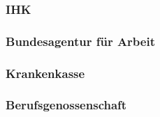 \subsubsection{IHK} \label{ihk}

\subsubsection{Bundesagentur für Arbeit} \label{bundesagenturFuerArbeit}

\subsubsection{Krankenkasse} \label{krankenkasse}

\subsubsection{Berufsgenossenschaft} \label{berufsgenossenschaft}
